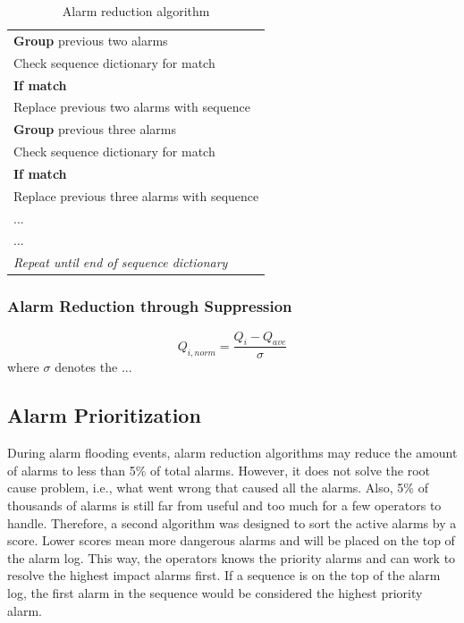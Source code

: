 \begin{table}[H]
{\begin{tabular}{p{14cm}}
	\hspace{1cm} \textbf{Group} previous two alarms \\
	\hspace{1.5cm} Check sequence dictionary for match \\
	\hspace{1.5cm} \textbf{If match} \\
	\hspace{2cm} Replace previous two alarms with sequence \\
	\hspace{1cm} \textbf{Group} previous three alarms \\
	\hspace{1.5cm} Check sequence dictionary for match \\
	\hspace{1.5cm} \textbf{If match} \\
	\hspace{2cm} Replace previous three alarms with sequence \\
	\hspace{1.5cm} ... \\
	\hspace{1.5cm} ... \\
	\hspace{1cm} \emph{Repeat until end of sequence dictionary} \\
	\hline
	\end{tabular}}
	\caption{Alarm reduction algorithm}
	\label{alg:03AlarmReduce}
\end{table}






\subsubsection{Alarm Reduction through Suppression}

\begin{equation}
    Q_{i, norm} = \frac{Q_i - Q_{ave}}{\sigma}
\end{equation}
where $\sigma$ denotes the ...









\subsection{Alarm Prioritization}
During alarm flooding events, alarm reduction algorithms may reduce the amount of alarms to less than 5\% of total alarms.  However, it does not solve the root cause problem, i.e., what went wrong that caused all the alarms.  Also, 5\% of thousands of alarms is still far from useful and too much for a few operators to handle.  Therefore, a second algorithm was designed to sort the active alarms by a score.  Lower scores mean more dangerous alarms and will be placed on the top of the alarm log.  This way, the operators knows the priority alarms and can work to resolve the highest impact alarms first.  If a sequence is on the top of the alarm log, the first alarm in the sequence would be considered the highest priority alarm.


